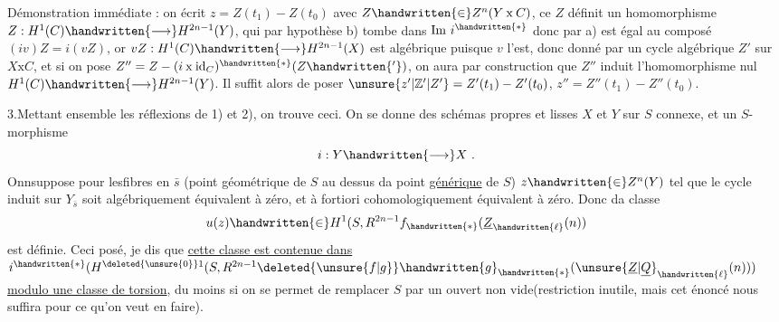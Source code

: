Démonstration immédiate : on écrit $z=Z(t_1)-Z(t_0)$ avec $Z\handwritten{\in}Z^n(Y\mathbin{\mathrm{x}}C)$, ce $Z$ définit un homomorphisme $Z:H^1(C)\handwritten{\longrightarrow}H^{2n-1}(Y)$,  qui par hypothèse b) tombe dans $\mathrm{Im}\ i^{\handwritten{*}}$ donc par  a) est égal au composé $(iv)Z=i(vZ)$, or $vZ:H^1(C)\handwritten{\longrightarrow}H^{2n-1}(X)$ est algébrique puisque $v$ l'est, donc donné par un cycle algébrique $Z'$ sur $X\mathbin{\mathrm{x}}C$, et si on pose $Z''=Z-(i\mathbin{\mathrm{x}}\mathrm{id}_C)^{\handwritten{*}}(Z\handwritten{'} )$, on aura par construction que $Z''$ induit l'homomorphisme nul $H^1(C)\handwritten{\longrightarrow}H^{2n-1}(Y)$.  Il suffit alors de poser $\unsure{z'|\mathbb{Z}'|Z'}=Z'(t_1)-Z'(t_0)$, $z''=Z''(t_1)-Z''(t_0)$.

3.\quad Mettant ensemble les réflexions de 1) et 2), on trouve ceci. On se donne des schémas propres et lisses $X$ et $Y$ sur $S$  connexe, et un $S$-morphisme
\[
i:Y\handwritten{\longrightarrow}X\ .
\]
Onnsuppose   pour lesfibres en $\bar s$ (point géométrique  de $S$ au dessus da point \uline{générique} de $S$)   $z\handwritten{\in}Z^n(Y)$ tel que le cycle induit sur $Y_{\bar s}$ soit algébriquement équivalent à zéro, et à fortiori cohomologiquement équivalent à zéro. Donc da classe
\[
u(z)\handwritten{\in}H^1(S,R^{2n-1}f_{\handwritten{*}}(\underline{Z}_{\handwritten{\ell}}(n))
\]
est définie. Ceci posé, je dis que \uline{cette classe est  contenue dans} $i^{\handwritten{*}}(H^{\deleted{\unsure{0}}1}(S,R^{2n-1}\deleted{\unsure{f|g}}\handwritten{g}_{\handwritten{*}}({\unsure{\underline{Z}|\underline{Q}}}_{\handwritten{\ell}}(n)))$ \uline{modulo une classe de torsion}, du moins si on    se permet de remplacer $S$ par un ouvert non vide(restriction  inutile, mais cet énoncé nous suffira pour ce qu'on veut en faire).

